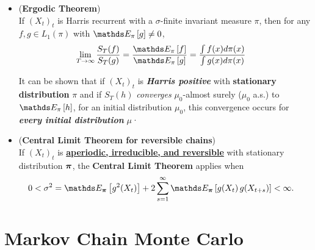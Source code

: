\documentclass[11pt]{article}
\begin{document}
\begin{itemize}
\item 
\begin{theorem} (\textbf{Ergodic Theorem})  \citep{robert1999monte} \\
If $(X_t)_t$ is Harris recurrent with a $\sigma$-finite invariant measure $\pi$, then for any $f, g \in L_1(\pi)$ with $\E{\pi}{g} \neq 0$, 
\begin{align}
\lim_{T\rightarrow \infty}\frac{S_T(f)}{S_T(g)} &= \frac{\E{\pi}{f}}{\E{\pi}{g}} = \frac{\int f(x)d\pi(x)}{\int g(x)d\pi(x)} \label{eqn: ergodic theorem}
\end{align}
\end{theorem}
It can be shown that if $(X_t)_t$  is \emph{\textbf{Harris positive}} with \textbf{stationary distribution} $\pi$ and if $S_T(h)$ \emph{converges} $\mu_0$-almost surely ($\mu_0$ a.s.) to $\E{\pi}{h}$, for an initial distribution $\mu_0$, this convergence occurs for \emph{\textbf{every initial distribution}} $\mu$·

\item \begin{theorem} (\textbf{Central Limit Theorem for reversible chains})\citep{robert1999monte} \\
If $(X_t)_t$ is \underline{\textbf{aperiodic, irreducible, and reversible}} with stationary distribution $\boldsymbol{\pi}$, the \textbf{Central Limit Theorem} applies when
\begin{align}
0< \sigma^2 &= \E{\mb{\pi}}{g^2(X_t)} + 2\sum_{s=1}^{\infty}\E{\mb{\pi}}{g(X_t)\, g(X_{t+s})} < \infty. \label{eqn: mc_asym_variance}
\end{align}
\end{theorem}
\end{itemize}


\section{Markov Chain Monte Carlo}
\end{document}
